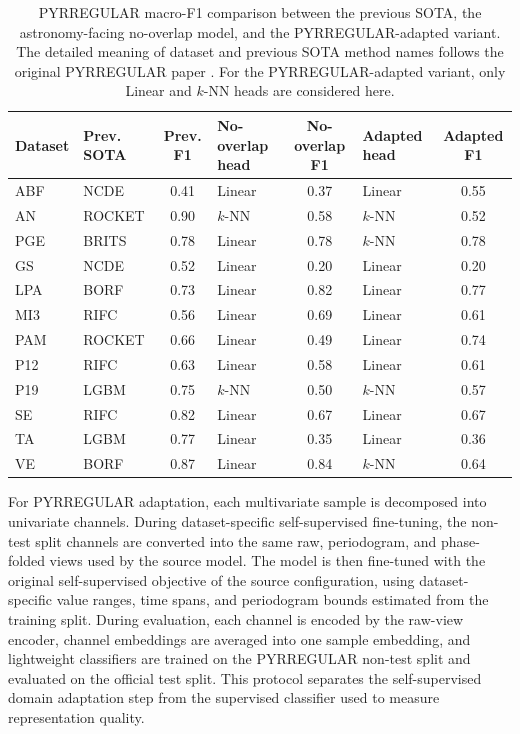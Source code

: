 \begin{table}[t]
    \caption{PYRREGULAR macro-F1 comparison between the previous SOTA, the
    astronomy-facing no-overlap model, and the PYRREGULAR-adapted variant.
    The detailed meaning of dataset and previous SOTA method names follows the
    original PYRREGULAR paper \cite{spinnato2026pyrregularunifiedframeworkirregular}.
    For the PYRREGULAR-adapted variant, only Linear and $k$-NN heads are
    considered here.}
    \label{tab:PYRREGULAR_domain_adaptation}
    \centering
    \begin{tabular}{l|lc|lc|lc}
        \hline
        Dataset
        & Prev. SOTA & Prev. F1
        & No-overlap head & No-overlap F1
        & Adapted head & Adapted F1 \\
        \hline
        ABF & NCDE   & 0.41 & Linear & 0.37 & Linear & 0.55 \\
        AN  & ROCKET & 0.90 & $k$-NN & 0.58 & $k$-NN & 0.52 \\
        PGE & BRITS  & 0.78 & Linear & 0.78 & $k$-NN & 0.78 \\
        GS  & NCDE   & 0.52 & Linear & 0.20 & Linear & 0.20 \\
        LPA & BORF   & 0.73 & Linear & 0.82 & Linear & 0.77 \\
        MI3 & RIFC   & 0.56 & Linear & 0.69 & Linear & 0.61 \\
        PAM & ROCKET & 0.66 & Linear & 0.49 & Linear & 0.74 \\
        P12 & RIFC   & 0.63 & Linear & 0.58 & Linear & 0.61 \\
        P19 & LGBM   & 0.75 & $k$-NN & 0.50 & $k$-NN & 0.57 \\
        SE  & RIFC   & 0.82 & Linear & 0.67 & Linear & 0.67 \\
        TA  & LGBM   & 0.77 & Linear & 0.35 & Linear & 0.36 \\
        VE  & BORF   & 0.87 & Linear & 0.84 & $k$-NN & 0.64 \\
        \hline
    \end{tabular}
\end{table}

For PYRREGULAR adaptation, each multivariate sample is decomposed into
univariate channels.  During dataset-specific self-supervised fine-tuning, the
non-test split channels are converted into the same raw, periodogram, and
phase-folded views used by the source model.  The model is then fine-tuned with
the original self-supervised objective of the source configuration, using
dataset-specific value ranges, time spans, and periodogram bounds estimated
from the training split.  During evaluation, each channel is encoded by the
raw-view encoder, channel embeddings are averaged into one sample embedding,
and lightweight classifiers are trained on the PYRREGULAR non-test split and
evaluated on the official test split.  This protocol separates the
self-supervised domain adaptation step from the supervised classifier used to
measure representation quality.

